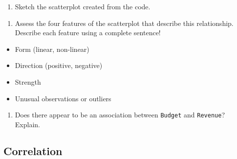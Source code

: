 \documentclass[
]{report}
\providecommand{\tightlist}{%
  \setlength{\itemsep}{0pt}\setlength{\parskip}{0pt}}
\begin{document}
\begin{enumerate}
\def\labelenumi{\arabic{enumi}.}
\setcounter{enumi}{2}
\tightlist
\item
  Sketch the scatterplot created from the code.
\end{enumerate}

\vspace{1.5in}
\newpage

\begin{enumerate}
\def\labelenumi{\arabic{enumi}.}
\setcounter{enumi}{3}
\tightlist
\item
  Assess the four features of the scatterplot that describe this relationship. Describe each feature using a complete sentence!
\end{enumerate}

\begin{itemize}
\tightlist
\item
  Form (linear, non-linear)
\end{itemize}

\vspace{.4in}

\begin{itemize}
\tightlist
\item
  Direction (positive, negative)
\end{itemize}

\vspace{.4in}

\begin{itemize}
\tightlist
\item
  Strength
\end{itemize}

\vspace{.4in}

\begin{itemize}
\tightlist
\item
  Unusual observations or outliers
\end{itemize}

\vspace{.4in}

\begin{enumerate}
\def\labelenumi{\arabic{enumi}.}
\setcounter{enumi}{4}
\tightlist
\item
  Does there appear to be an association between \texttt{Budget} and \texttt{Revenue}? Explain.
\end{enumerate}

\vspace{1in}

\hypertarget{correlation}{%
\subsection*{Correlation}\label{correlation}}
\end{document}
